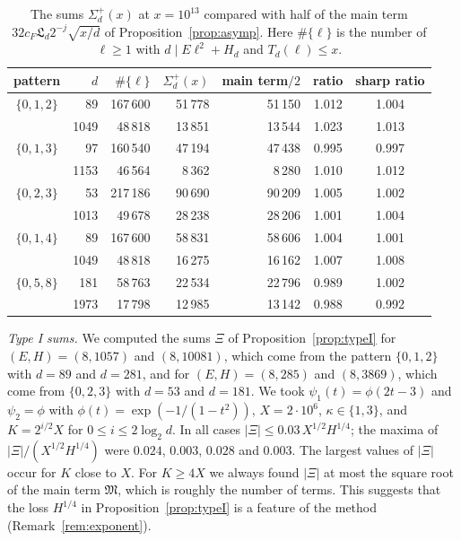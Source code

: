 \documentclass[11pt]{amsart}
\theoremstyle{remark}
\theoremstyle{definition}
\numberwithin{equation}{section}
\newcommand{\Lf}{\mathfrak{L}}
\begin{document}
\begin{table}[h]
\centering
\setlength{\tabcolsep}{6pt}
\begin{tabular}{crrrrcc}
\toprule
pattern & $d$ & $\#\{\ell\}$ & $\Sigma^+_d(x)$ & main term$/2$ & ratio & sharp ratio\\
\midrule
$\{0,1,2\}$ & 89 & 167\,600 & 51\,778 & 51\,150 & 1.012 & 1.004\\
 & 1049 & 48\,818 & 13\,851 & 13\,544 & 1.023 & 1.013\\
$\{0,1,3\}$ & 97 & 160\,540 & 47\,194 & 47\,438 & 0.995 & 0.997\\
 & 1153 & 46\,564 & 8\,362 & 8\,280 & 1.010 & 1.012\\
$\{0,2,3\}$ & 53 & 217\,186 & 90\,690 & 90\,209 & 1.005 & 1.002\\
 & 1013 & 49\,678 & 28\,238 & 28\,206 & 1.001 & 1.004\\
$\{0,1,4\}$ & 89 & 167\,600 & 58\,831 & 58\,606 & 1.004 & 1.001\\
 & 1049 & 48\,818 & 16\,275 & 16\,162 & 1.007 & 1.008\\
$\{0,5,8\}$ & 181 & 58\,763 & 22\,534 & 22\,796 & 0.989 & 1.002\\
 & 1973 & 17\,798 & 12\,985 & 13\,142 & 0.988 & 0.992\\
\bottomrule
\end{tabular}
\caption{The sums $\Sigma^+_d(x)$ at $x=10^{13}$ compared with half of the main term $32c_F\Lf_d2^{-j}\sqrt{x/d}$ of Proposition~\ref{prop:asymp}. Here $\#\{\ell\}$ is the number of $\ell\ge1$ with $d\mid E\ell^2+H_d$ and $T_d(\ell)\le x$.}
\label{tab:main}
\end{table}

\emph{Type I sums.} We computed the sums $\Xi$ of Proposition~\ref{prop:typeI} for $(E,H)=(8,1057)$ and $(8,10081)$, which come from the pattern $\{0,1,2\}$ with $d=89$ and $d=281$, and for $(E,H)=(8,285)$ and $(8,3869)$, which come from $\{0,2,3\}$ with $d=53$ and $d=181$. We took $\psi_1(t)=\phi(2t-3)$ and $\psi_2=\phi$ with $\phi(t)=\exp(-1/(1-t^2))$, $X=2\cdot10^6$, $\kappa\in\{1,3\}$, and $K=2^{i/2}X$ for $0\le i\le2\log_2d$. In all cases $|\Xi|\le0.03\,X^{1/2}H^{1/4}$; the maxima of $|\Xi|/(X^{1/2}H^{1/4})$ were $0.024$, $0.003$, $0.028$ and $0.003$. The largest values of $|\Xi|$ occur for $K$ close to $X$. For $K\ge4X$ we always found $|\Xi|$ at most the square root of the main term $\mathfrak M$, which is roughly the number of terms. This suggests that the loss $H^{1/4}$ in Proposition~\ref{prop:typeI} is a feature of the method (Remark~\ref{rem:exponent}).
\end{document}
